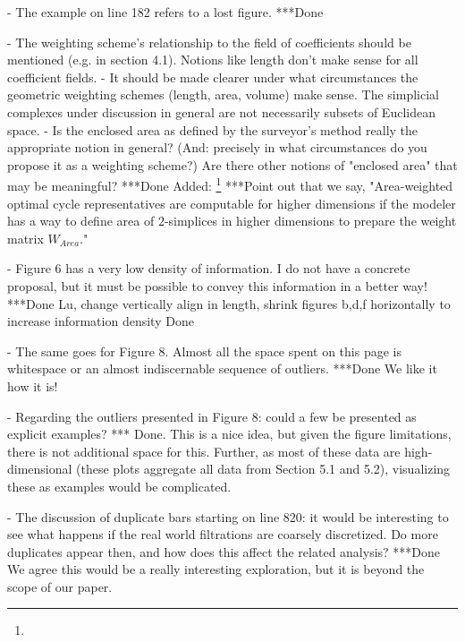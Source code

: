 \documentclass{article}
\begin{document}
- The example on line 182 refers to a lost figure.  
***Done


- The weighting scheme's relationship to the field of coefficients should be mentioned (e.g. in section 4.1). Notions like length don't make sense for all coefficient fields. 
- It should be made clearer under what circumstances the geometric weighting schemes (length, area, volume) make sense. The simplicial complexes under discussion in general are not necessarily subsets of Euclidean space.
- Is the enclosed area as defined by the surveyor's method really the appropriate notion in general? (And: precisely in what circumstances do you propose it as a weighting scheme?) Are there other notions of "enclosed area" that may be meaningful?
***Done 
Added: \footnote{}
***Point out that we say, "Area-weighted optimal cycle representatives are computable for higher dimensions if the modeler has a way to define area of $2$-simplices in higher dimensions to prepare the weight matrix $W_{Area}$."



- Figure 6 has a very low density of information. I do not have a concrete proposal, but it must be possible to convey this information in a better way! 
***Done Lu, change vertically align in length, shrink figures b,d,f horizontally to increase information density Done


- The same goes for Figure 8. Almost all the space spent on this page is whitespace or an almost indiscernable sequence of outliers.
***Done
We like it how it is!


- Regarding the outliers presented in Figure 8: could a few be presented as explicit examples?
*** Done.
This is a nice idea, but given the figure limitations, there is not additional space for this. Further, as most of these data are high-dimensional (these plots aggregate all data from Section 5.1 and 5.2), visualizing these as examples would be complicated.


- The discussion of duplicate bars starting on line 820: it would be interesting to see what happens if the real world filtrations are coarsely discretized. Do more duplicates appear then, and how does this affect the related analysis?
***Done
We agree this would be a really interesting exploration, but it is beyond the scope of our paper.
\end{document}
